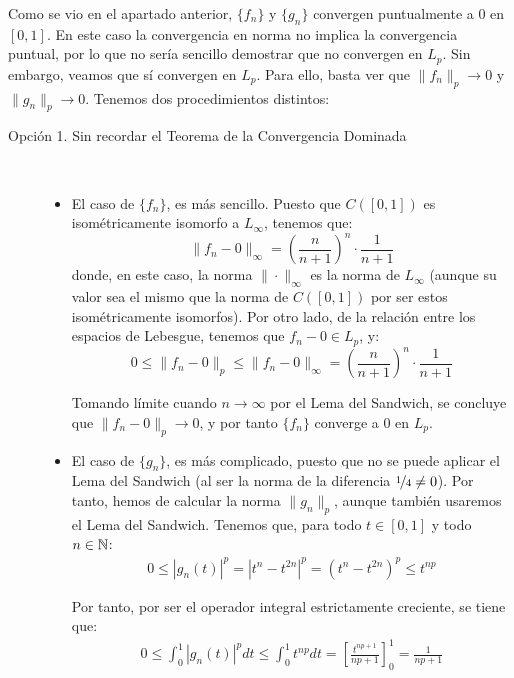 \begin{ejercicio}
\begin{enumerate}
    Como se vio en el apartado anterior, $\{f_n\}$ y $\{g_n\}$ convergen puntualmente a $0$ en $\left[0, 1\right]$. En este caso la convergencia en norma no implica la convergencia puntual, por lo que no sería sencillo demostrar que no convergen en $L_p$. Sin embargo, veamos que sí convergen en $L_p$. Para ello, basta ver que $\|f_n\|_p \to 0$ y $\|g_n\|_p \to 0$. Tenemos dos procedimientos distintos:
    \begin{description}
        \item[Opción 1. Sin recordar el Teorema de la Convergencia Dominada] \
        \begin{itemize}
            \item El caso de $\{f_n\}$, es más sencillo. Puesto que $C([0, 1])$ es isométricamente isomorfo a $L_\infty$, tenemos que:
            \begin{equation*}
                \|f_n - 0\|_\infty = \left(\frac{n}{n+1}\right)^n \cdot \frac{1}{n+1}
            \end{equation*}
            donde, en este caso, la norma $\|\cdot\|_\infty$ es la norma de $L_\infty$ (aunque su valor sea el mismo que la norma de $C([0, 1])$ por ser estos isométricamente isomorfos). Por otro lado, de la relación entre los espacios de Lebesgue, tenemos que $f_n-0 \in L_p$, y:
            \begin{equation*}
                0\leq \|f_n - 0\|_p \leq \|f_n - 0\|_\infty = \left(\frac{n}{n+1}\right)^n \cdot \frac{1}{n+1}
            \end{equation*}

            Tomando límite cuando $n \to \infty$ por el Lema del Sandwich, se concluye que $\|f_n - 0\|_p \to 0$, y por tanto $\{f_n\}$ converge a $0$ en $L_p$.
            \item El caso de $\{g_n\}$, es más complicado, puesto que no se puede aplicar el Lema del Sandwich (al ser la norma de la diferencia $\nicefrac{1}{4}\neq 0$). Por tanto, hemos de calcular la norma $\|g_n\|_p$, aunque también usaremos el Lema del Sandwich. Tenemos que, para todo $t\in [0, 1]$ y todo $n \in \mathbb{N}$:
            \begin{align*}
                0\leq |g_n(t)|^p = |t^n - t^{2n}|^p = (t^n - t^{2n})^p \leq t^{np}
            \end{align*}

            Por tanto, por ser el operador integral estrictamente creciente, se tiene que:
            \begin{align*}
                0\leq \int_0^1 |g_n(t)|^p dt \leq \int_0^1 t^{np} dt = \left[\frac{t^{np+1}}{np+1}\right]_0^1 = \frac{1}{np+1}
            \end{align*}


\end{itemize}
\end{description}
\end{enumerate}
\end{ejercicio}
